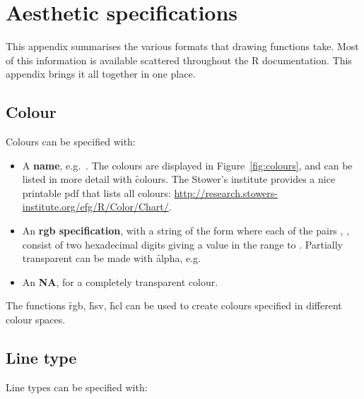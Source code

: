 

\chapter{Aesthetic specifications}
\label{cha:aesthetic_specifications}

This appendix summarises the various formats that  drawing functions take.  Most of this information is available scattered throughout the R documentation.  This appendix brings it all together in one place.

\section{Colour}
\label{sec:colour_spec}

Colours can be specified with:

\begin{itemize}
  \item A {\bf name}, e.g.\ . The colours are displayed in Figure~\ref{fig:colours}, and can be listed in more detail with \f{colours}. The Stower's institute provides a nice printable pdf that lists all colours:  \url{http://research.stowers-institute.org/efg/R/Color/Chart/}.
    
  \item An {\bf rgb specification}, with a string of the form  where each of the pairs , ,  consist of two hexadecimal digits giving a value in the range  to .  Partially transparent can be made with \f{alpha}, e.g.\ 

  \item An {\bf NA}, for a completely transparent colour.  
\end{itemize}

The functions \f{rgb}, \f{hsv}, \f{hcl} can be used to create colours specified in different colour spaces.


\section{Line type}
\label{sec:line_type_spec}

Line types can be specified with:

